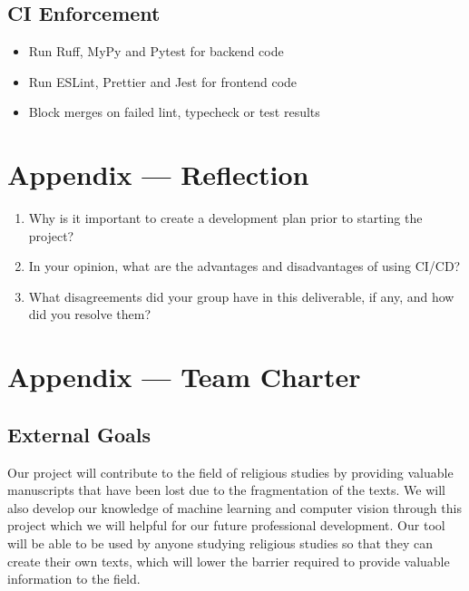 \documentclass{article}
\begin{document}
\subsection*{CI Enforcement}
\begin{itemize}
    \item Run Ruff, MyPy and Pytest for backend code
    \item Run ESLint, Prettier and Jest for frontend code
    \item Block merges on failed lint, typecheck or test results
\end{itemize}

\newpage{}

\section*{Appendix --- Reflection}




\begin{enumerate}
    \item Why is it important to create a development plan prior to starting the
    project?
    \item In your opinion, what are the advantages and disadvantages of using
    CI/CD?
    \item What disagreements did your group have in this deliverable, if any,
    and how did you resolve them?
\end{enumerate}

\newpage{}

\section*{Appendix --- Team Charter}


\subsection*{External Goals}

Our project will contribute to the field of religious studies by providing valuable manuscripts that have been lost due to the fragmentation of the texts. We will also develop our knowledge 
of machine learning and computer vision through this project which we will helpful for our future professional development. Our tool will be able to be used by anyone studying 
religious studies so that they can create their own texts, which will lower the barrier required to provide valuable information to the field.
\end{document}
